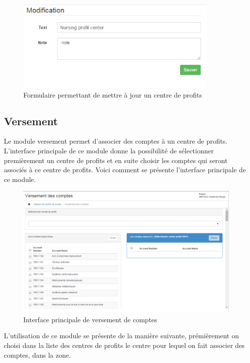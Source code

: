 \documentclass[12pt,a4paper]{report}
\begin{document}
\begin{figure}[h]
\begin{center}
\includegraphics[width=10cm]{pic/ModificationProfit.png}
\end{center}
\caption{Formulaire permettant de mettre à jour un centre de profits}
\label{Formulaire permettant de mettre à jour un centre de profits}
\end{figure} 
\newpage
\subsection{Versement}
Le module versement permet d'associer des comptes à un centre de profits. L'interface principale de ce module donne la possibilité de sélectionner premièrement un centre de profits et en suite choisir les comptes qui seront associés à ce centre de profits. Voici comment se présente l'interface principale de ce module.

\begin{figure}[h]
\begin{center}
\includegraphics[width=12cm]{pic/VerserCompteProfit.png}
\end{center}
\caption{Interface principale de versement de comptes}
\label{Interface principale de versement de comptes}
\end{figure} 

L'utilisation de ce module se présente de la manière suivante, prémièrement on choisi dans la liste des centres de profits le centre pour lequel on fait associer des comptes, dans la zone.
\end{document}
